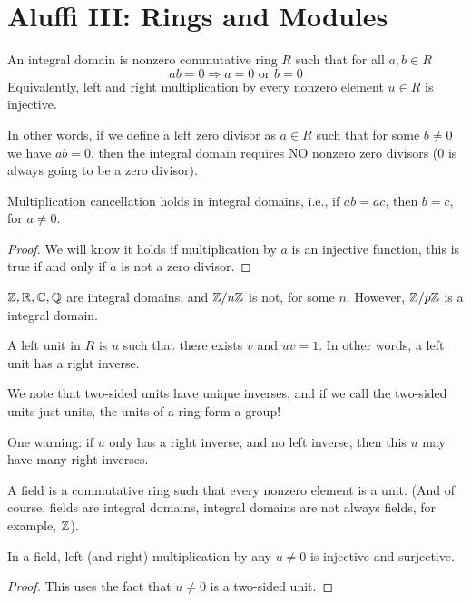\chapter{Aluffi III: Rings and Modules}
\begin{defn}
    An integral domain is nonzero commutative ring $R$ such that for all $a,b\in R$
    \begin{equation*}
        ab=0 \Rightarrow a=0 \text{ or } b=0
    \end{equation*}
    Equivalently, left and right multiplication by every nonzero element $u\in R$ is injective.
\end{defn}
In other words, if we define a left zero divisor as $a\in R$ such that for some $b\neq 0$ we have $ab=0$, then the integral domain requires NO nonzero zero divisors (0 is always going to be a zero divisor).
\begin{prop}
    Multiplication cancellation holds in integral domains, i.e., if $ab=ac$, then $b=c$, for $a\neq 0$.
\end{prop}
\begin{proof}
    We will know it holds if multiplication by $a$ is an injective function, this is true if and only if $a$ is not a zero divisor.
\end{proof}
\begin{example}
    $\mathbb{Z}, \mathbb{R}, \mathbb{C}, \mathbb{Q}$ are integral domains, and $\mathbb{Z}/n\mathbb{Z}$ is not, for some $n$. However, $\mathbb{Z}/p\mathbb{Z}$ is a integral domain.
\end{example}
\begin{defn}
    A left unit in $R$ is $u$ such that there exists $v$ and $uv=1$. In other words, a left unit has a right inverse.
\end{defn}
We note that two-sided units have unique inverses, and if we call the two-sided units just units, the units of a ring form a group!

One warning: if $u$ only has a right inverse, and no left inverse, then this $u$ may have many right inverses.
\begin{defn}[field]
   A field is a commutative ring such that every nonzero element is a unit. (And of course, fields are integral domains, integral domains are not always fields, for example, $\mathbb{Z}$).
\end{defn}
\begin{prop}
    In a field, left (and right) multiplication by any $u\neq 0$ is injective and surjective.
\end{prop}
\begin{proof}
    This uses the fact that $u\neq 0$ is a two-sided unit.
\end{proof}

